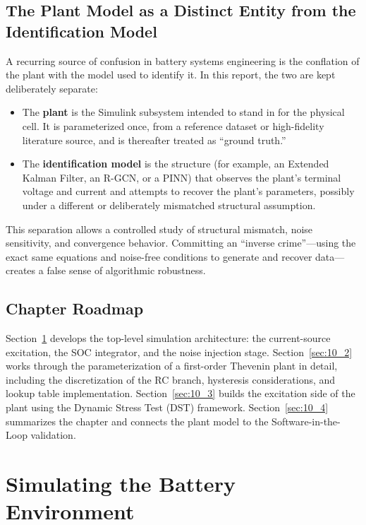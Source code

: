\subsection{The Plant Model as a Distinct Entity from the Identification Model}

A recurring source of confusion in battery systems engineering is the conflation of the plant with the model used to identify it. In this report, the two are kept deliberately separate:

\begin{itemize}
    \item The \textbf{plant} is the Simulink subsystem intended to stand in for the physical cell. It is parameterized once, from a reference dataset or high-fidelity literature source, and is thereafter treated as ``ground truth.''
    \item The \textbf{identification model} is the structure (for example, an Extended Kalman Filter, an R-GCN, or a PINN) that observes the plant's terminal voltage and current and attempts to recover the plant's parameters, possibly under a different or deliberately mismatched structural assumption.
\end{itemize}

This separation allows a controlled study of structural mismatch, noise sensitivity, and convergence behavior. Committing an ``inverse crime''—using the exact same equations and noise-free conditions to generate and recover data—creates a false sense of algorithmic robustness. 

\subsection{Chapter Roadmap}

Section~\ref{sec:10_1} develops the top-level simulation architecture: the current-source excitation, the SOC integrator, and the noise injection stage. Section~\ref{sec:10_2} works through the parameterization of a first-order Thevenin plant in detail, including the discretization of the RC branch, hysteresis considerations, and lookup table implementation. Section~\ref{sec:10_3} builds the excitation side of the plant using the Dynamic Stress Test (DST) framework. Section~\ref{sec:10_4} summarizes the chapter and connects the plant model to the Software-in-the-Loop validation.

\section{Simulating the Battery Environment}
\label{sec:10_1}

